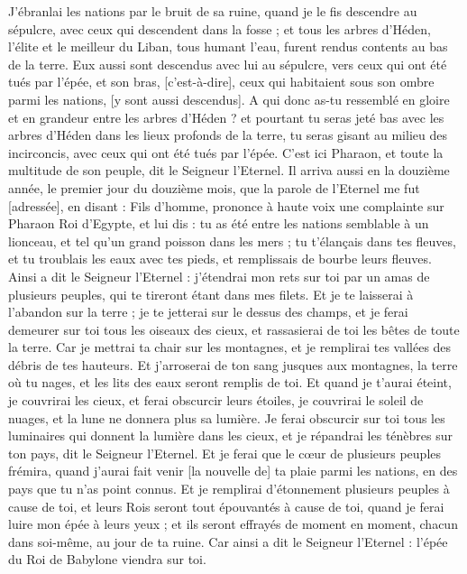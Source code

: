 \begin{multicols}{2}
J'ébranlai les nations par le bruit de sa ruine, quand je le fis descendre au sépulcre, avec ceux qui descendent dans la fosse ; et tous les arbres d'Héden, l'élite et le meilleur du Liban, tous humant l'eau, furent rendus contents au bas de la terre.
Eux aussi sont descendus avec lui au sépulcre, vers ceux qui ont été tués par l'épée, et son bras, [c'est-à-dire], ceux qui habitaient sous son ombre parmi les nations, [y sont aussi descendus].
A qui donc as-tu ressemblé en gloire et en grandeur entre les arbres d'Héden ? et pourtant tu seras jeté bas avec les arbres d'Héden dans les lieux profonds de la terre, tu seras gisant au milieu des incirconcis, avec ceux qui ont été tués par l'épée. C'est ici Pharaon, et toute la multitude de son peuple, dit le Seigneur l'Eternel.
\VerseOne{}Il arriva aussi en la douzième année, le premier jour du douzième mois, que la parole de l'Eternel me fut [adressée], en disant :
Fils d'homme, prononce à haute voix une complainte sur Pharaon Roi d'Egypte, et lui dis : tu as été entre les nations semblable à un lionceau, et tel qu'un grand poisson dans les mers ; tu t'élançais dans tes fleuves, et tu troublais les eaux avec tes pieds, et remplissais de bourbe leurs fleuves.
Ainsi a dit le Seigneur l'Eternel : j'étendrai mon rets sur toi par un amas de plusieurs peuples, qui te tireront étant dans mes filets.
Et je te laisserai à l'abandon sur la terre ; je te jetterai sur le dessus des champs, et je ferai demeurer sur toi tous les oiseaux des cieux, et rassasierai de toi les bêtes de toute la terre.
Car je mettrai ta chair sur les montagnes, et je remplirai tes vallées des débris de tes hauteurs.
Et j'arroserai de ton sang jusques aux montagnes, la terre où tu nages, et les lits des eaux seront remplis de toi.
Et quand je t'aurai éteint, je couvrirai les cieux, et ferai obscurcir leurs étoiles, je couvrirai le soleil de nuages, et la lune ne donnera plus sa lumière.
Je ferai obscurcir sur toi tous les luminaires qui donnent la lumière dans les cieux, et je répandrai les ténèbres sur ton pays, dit le Seigneur l'Eternel.
Et je ferai que le cœur de plusieurs peuples frémira, quand j'aurai fait venir [la nouvelle de] ta plaie parmi les nations, en des pays que tu n'as point connus.
Et je remplirai d'étonnement plusieurs peuples à cause de toi, et leurs Rois seront tout épouvantés à cause de toi, quand je ferai luire mon épée à leurs yeux ; et ils seront effrayés de moment en moment, chacun dans soi-même, au jour de ta ruine.
Car ainsi a dit le Seigneur l'Eternel : l'épée du Roi de Babylone viendra sur toi.

\end{multicols}
